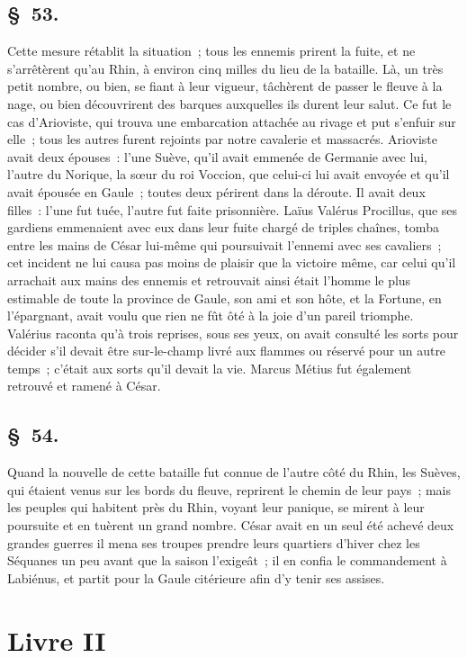 \documentclass[french,twoside]{book} %
\begin{document}
\subsection[{§ 53.}]{ \textsc{§ 53.} }
\noindent Cette mesure rétablit la situation ; tous les ennemis prirent la fuite, et ne s’arrêtèrent qu’au Rhin, à environ cinq milles du lieu de la bataille. Là, un très petit nombre, ou bien, se fiant à leur vigueur, tâchèrent de passer le fleuve à la nage, ou bien découvrirent des barques auxquelles ils durent leur salut. Ce fut le cas d’Arioviste, qui trouva une embarcation attachée au rivage et put s’enfuir sur elle ; tous les autres furent rejoints par notre cavalerie et massacrés. Arioviste avait deux épouses : l’une Suève, qu’il avait emmenée de Germanie avec lui, l’autre du Norique, la sœur du roi Voccion, que celui-ci lui avait envoyée et qu’il avait épousée en Gaule ; toutes deux périrent dans la déroute. Il avait deux filles : l’une fut tuée, l’autre fut faite prisonnière. Laïus Valérus Procillus, que ses gardiens emmenaient avec eux dans leur fuite chargé de triples chaînes, tomba entre les mains de César lui-même qui poursuivait l’ennemi avec ses cavaliers ; cet incident ne lui causa pas moins de plaisir que la victoire même, car celui qu’il arrachait aux mains des ennemis et retrouvait ainsi était l’homme le plus estimable de toute la province de Gaule, son ami et son hôte, et la Fortune, en l’épargnant, avait voulu que rien ne fût ôté à la joie d’un pareil triomphe. Valérius raconta qu’à trois reprises, sous ses yeux, on avait consulté les sorts pour décider s’il devait être sur-le-champ livré aux flammes ou réservé pour un autre temps ; c’était aux sorts qu’il devait la vie. Marcus Métius fut également retrouvé et ramené à César.
\subsection[{§ 54.}]{ \textsc{§ 54.} }
\noindent Quand la nouvelle de cette bataille fut connue de l’autre côté du Rhin, les Suèves, qui étaient venus sur les bords du fleuve, reprirent le chemin de leur pays ; mais les peuples qui habitent près du Rhin, voyant leur panique, se mirent à leur poursuite et en tuèrent un grand nombre. César avait en un seul été achevé deux grandes guerres il mena ses troupes prendre leurs quartiers d’hiver chez les Séquanes un peu avant que la saison l’exigeât ; il en confia le commandement à Labiénus, et partit pour la Gaule citérieure afin d’y tenir ses assises.
 \section[{Livre II}]{Livre II}\renewcommand{\leftmark}{Livre II}
\end{document}
